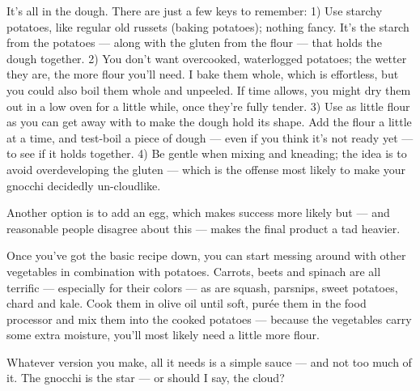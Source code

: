 It’s all in the dough. There are just a few keys to remember: 1) Use
starchy potatoes, like regular old russets (baking potatoes); nothing
fancy. It’s the starch from the potatoes — along with the gluten from
the flour — that holds the dough together. 2) You don’t want
overcooked, waterlogged potatoes; the wetter they are, the more flour
you’ll need. I bake them whole, which is effortless, but you could
also boil them whole and unpeeled. If time allows, you might dry them
out in a low oven for a little while, once they’re fully tender. 3)
Use as little flour as you can get away with to make the dough hold
its shape. Add the flour a little at a time, and test-boil a piece of
dough — even if you think it’s not ready yet — to see if it holds
together. 4) Be gentle when mixing and kneading; the idea is to avoid
overdeveloping the gluten — which is the offense most likely to make
your gnocchi decidedly un-cloudlike.

Another option is to add an egg, which makes success more likely but —
and reasonable people disagree about this — makes the final product a
tad heavier.

Once you’ve got the basic recipe down, you can start messing around
with other vegetables in combination with potatoes. Carrots, beets and
spinach are all terrific — especially for their colors — as are
squash, parsnips, sweet potatoes, chard and kale. Cook them in olive
oil until soft, purée them in the food processor and mix them into the
cooked potatoes — because the vegetables carry some extra moisture,
you’ll most likely need a little more flour.

Whatever version you make, all it needs is a simple sauce — and not
too much of it. The gnocchi is the star — or should I say, the cloud?
